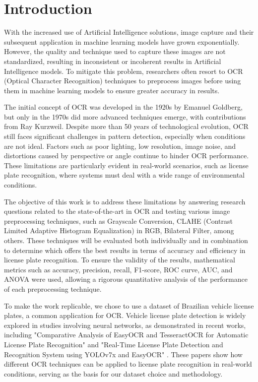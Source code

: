 \documentclass[conference]{IEEEtran}
\begin{document}
	\section{Introduction}
	With the increased use of Artificial Intelligence solutions, image capture and their subsequent application in machine learning models have grown exponentially. However, the quality and technique used to capture these images are not standardized, resulting in inconsistent or incoherent results in Artificial Intelligence models. To mitigate this problem, researchers often resort to OCR (Optical Character Recognition) techniques to preprocess images before using them in machine learning models to ensure greater accuracy in results.
	
	The initial concept of OCR was developed in the 1920s by Emanuel Goldberg, but only in the 1970s did more advanced techniques emerge, with contributions from Ray Kurzweil. Despite more than 50 years of technological evolution, OCR still faces significant challenges in pattern detection, especially when conditions are not ideal. Factors such as poor lighting, low resolution, image noise, and distortions caused by perspective or angle continue to hinder OCR performance. These limitations are particularly evident in real-world scenarios, such as license plate recognition, where systems must deal with a wide range of environmental conditions.
	
	The objective of this work is to address these limitations by answering research questions related to the state-of-the-art in OCR and testing various image preprocessing techniques, such as Grayscale Conversion, CLAHE (Contrast Limited Adaptive Histogram Equalization) in RGB, Bilateral Filter, among others. These techniques will be evaluated both individually and in combination to determine which offers the best results in terms of accuracy and efficiency in license plate recognition. To ensure the validity of the results, mathematical metrics such as accuracy, precision, recall, F1-score, ROC curve, AUC, and ANOVA were used, allowing a rigorous quantitative analysis of the performance of each preprocessing technique.
	
	To make the work replicable, we chose to use a dataset of Brazilian vehicle license plates, a common application for OCR. Vehicle license plate detection is widely explored in studies involving neural networks, as demonstrated in recent works, including "Comparative Analysis of EasyOCR and TesseractOCR for Automatic License Plate Recognition" \cite{b1} and "Real-Time License Plate Detection and Recognition System using YOLOv7x and EasyOCR" \cite{b2}. These papers show how different OCR techniques can be applied to license plate recognition in real-world conditions, serving as the basis for our dataset choice and methodology.
	
\end{document}
